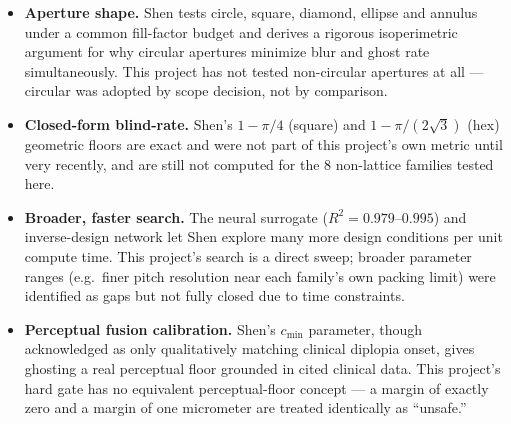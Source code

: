 \begin{itemize}
  \item \textbf{Aperture shape.} Shen tests circle, square, diamond,
  ellipse and annulus under a common fill-factor budget and derives a
  rigorous isoperimetric argument for why circular apertures minimize
  blur and ghost rate simultaneously. This project has not tested
  non-circular apertures at all --- circular was adopted by scope
  decision, not by comparison.
  \item \textbf{Closed-form blind-rate.} Shen's $1-\pi/4$ (square) and
  $1-\pi/(2\sqrt3)$ (hex) geometric floors are exact and were not part of
  this project's own metric until very recently, and are still not
  computed for the 8 non-lattice families tested here.
  \item \textbf{Broader, faster search.} The neural surrogate
  ($R^2=0.979$--$0.995$) and inverse-design network let Shen explore many
  more design conditions per unit compute time. This project's search is
  a direct sweep; broader parameter ranges (e.g.\ finer pitch resolution
  near each family's own packing limit) were identified as gaps but not
  fully closed due to time constraints.
  \item \textbf{Perceptual fusion calibration.} Shen's $c_{\min}$
  parameter, though acknowledged as only qualitatively matching clinical
  diplopia onset, gives ghosting a real perceptual floor grounded in
  cited clinical data. This project's hard gate has no equivalent
  perceptual-floor concept --- a margin of exactly zero and a margin of
  one micrometer are treated identically as ``unsafe.''
\end{itemize}


\newpage
